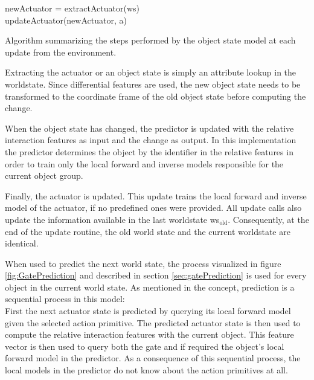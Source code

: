 \begin{algorithm}
	\BlankLine
	newActuator = extractActuator(ws) \\
	updateActuator(newActuator, a) \\
	\BlankLine
\caption{Algorithm summarizing the steps performed by the object state model at each update from the environment.}
\label{alg:gateUpdate}
\end{algorithm}

Extracting the actuator or an object state is simply an attribute lookup in the worldstate. Since differential features are used, the new object state needs to be transformed to the coordinate frame of the old object state before computing the change.

When the object state has changed, the predictor is updated with the relative interaction features as input and the change as output. In this implementation the predictor determines the object by the identifier in the relative features in order to train only the local forward and inverse models responsible for the current object group.

Finally, the actuator is updated. This update trains the local forward and inverse model of the actuator, if no predefined ones were provided.
All update calls also update the information available in the last worldstate ws$_\text{old}$. Consequently, at the end of the update routine, the old world state and the current worldstate are identical.

When used to predict the next world state, the process visualized in figure \ref{fig:GatePrediction} and described in section \ref{sec:gatePrediction} is used for every object in the current world state. As mentioned in the concept, prediction is a sequential process in this model: \\
First the next actuator state is predicted by querying its local forward model given the selected action primitive. The predicted actuator state is then used to compute the relative interaction features with the current object. This feature vector is then used to query both the gate and if required the object's local forward model in the predictor. 
As a consequence of this sequential process, the local models in the predictor do not know about the action primitives at all. %

